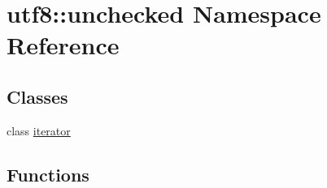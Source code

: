 \hypertarget{namespaceutf8_1_1unchecked}{}\section{utf8\+:\+:unchecked Namespace Reference}
\label{namespaceutf8_1_1unchecked}
\subsection*{Classes}
\begin{DoxyCompactItemize}
\item 
class \hyperlink{classutf8_1_1unchecked_1_1iterator}{iterator}
\end{DoxyCompactItemize}
\subsection*{Functions}
